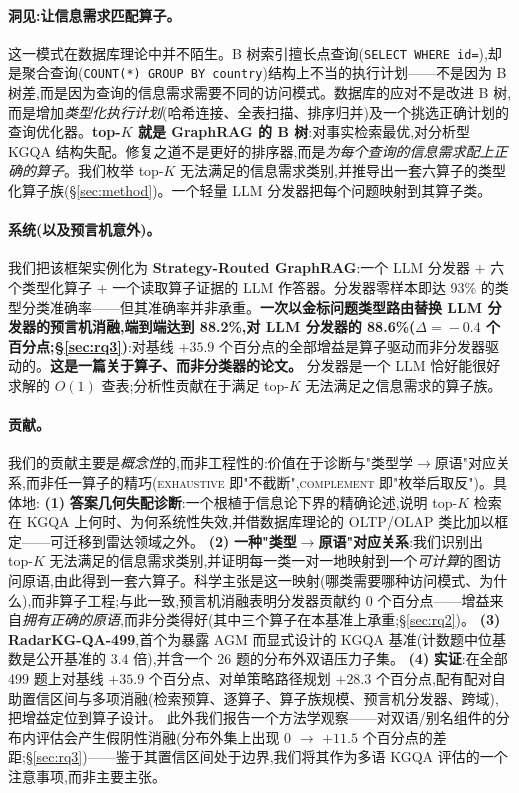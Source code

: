\documentclass[11pt,a4paper]{article}
\newcommand{\op}[1]{\textsc{\small #1}}
\begin{document}
\paragraph{洞见:让信息需求匹配算子。}
这一模式在数据库理论中并不陌生。B 树索引擅长点查询(\texttt{SELECT WHERE id\!=}),却是聚合查询(\texttt{COUNT(*) GROUP BY country})结构上不当的执行计划——不是因为 B 树差,而是因为查询的信息需求需要不同的访问模式。数据库的应对不是改进 B 树,而是增加\emph{类型化执行计划}(哈希连接、全表扫描、排序归并)及一个挑选正确计划的查询优化器。\textbf{top-$K$ 就是 GraphRAG 的 B 树}:对事实检索最优,对分析型 KGQA 结构失配。修复之道不是更好的排序器,而是\emph{为每个查询的信息需求配上正确的算子}。我们枚举 top-$K$ 无法满足的信息需求类别,并推导出一套六算子的类型化算子族(\S\ref{sec:method})。一个轻量 LLM 分发器把每个问题映射到其算子类。

\paragraph{系统(以及预言机意外)。}
我们把该框架实例化为 \textbf{Strategy-Routed GraphRAG}:一个 LLM 分发器 + 六个类型化算子 + 一个读取算子证据的 LLM 作答器。分发器零样本即达 93\% 的类型分类准确率——但其准确率并非承重。\textbf{一次以金标问题类型路由替换 LLM 分发器的预言机消融,端到端达到 88.2\%,对 LLM 分发器的 88.6\%($\Delta\!=\!-0.4$ 个百分点;\S\ref{sec:rq3})}:对基线 $+35.9$ 个百分点的全部增益是算子驱动而非分发器驱动的。\textbf{这是一篇关于算子、而非分类器的论文。} 分发器是一个 LLM 恰好能很好求解的 $O(1)$ 查表;分析性贡献在于满足 top-$K$ 无法满足之信息需求的算子族。

\paragraph{贡献。}
我们的贡献主要是\emph{概念性}的,而非工程性的:价值在于诊断与"类型学$\to$原语"对应关系,而非任一算子的精巧(\op{exhaustive} 即"不截断",\op{complement} 即"枚举后取反")。具体地:
\textbf{(1)} \textbf{答案几何失配诊断}:一个根植于信息论下界的精确论述,说明 top-$K$ 检索在 KGQA 上何时、为何系统性失效,并借数据库理论的 OLTP/OLAP 类比加以框定——可迁移到雷达领域之外。
\textbf{(2)} \textbf{一种"类型$\to$原语"对应关系}:我们识别出 top-$K$ 无法满足的信息需求类别,并证明每一类一对一地映射到一个\emph{可计算}的图访问原语,由此得到一套六算子。科学主张是这一映射(哪类需要哪种访问模式、为什么),而非算子工程;与此一致,预言机消融表明分发器贡献约 0 个百分点——增益来自\emph{拥有正确的原语},而非分类得好(其中三个算子在本基准上承重;\S\ref{sec:rq2})。
\textbf{(3)} \textbf{RadarKG-QA-499},首个为暴露 AGM 而显式设计的 KGQA 基准(计数题中位基数是公开基准的 $3.4$ 倍),并含一个 26 题的分布外双语压力子集。
\textbf{(4)} \textbf{实证}:在全部 499 题上对基线 $+35.9$ 个百分点、对单策略路径规划 $+28.3$ 个百分点,配有配对自助置信区间与多项消融(检索预算、逐算子、算子族规模、预言机分发器、跨域),把增益定位到算子设计。
此外我们报告一个方法学观察——对双语/别名组件的分布内评估会产生假阴性消融(分布外集上出现 0 $\to$ $+11.5$ 个百分点的差距;\S\ref{sec:rq3})——鉴于其置信区间处于边界,我们将其作为多语 KGQA 评估的一个注意事项,而非主要主张。
\end{document}
